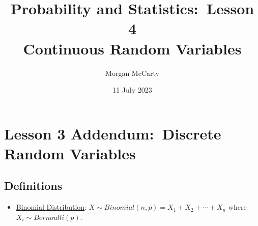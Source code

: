 \documentclass[12pt]{article}
\title{
    Probability and Statistics:\ Lesson 4
    \\Continuous Random Variables}
\author{Morgan McCarty}
\date{11 July 2023}
\begin{document}
    \maketitle

    \section{Lesson 3 Addendum:\ Discrete Random Variables}
        \subsection{Definitions}
            \begin{itemize}
                \item \underline{Binomial Distribution}: $X \sim Binomial(n, p) = X_1 + X_2 + \cdots + X_n$ where $X_i \sim Bernoulli(p)$.
            \end{itemize}
\end{document}
